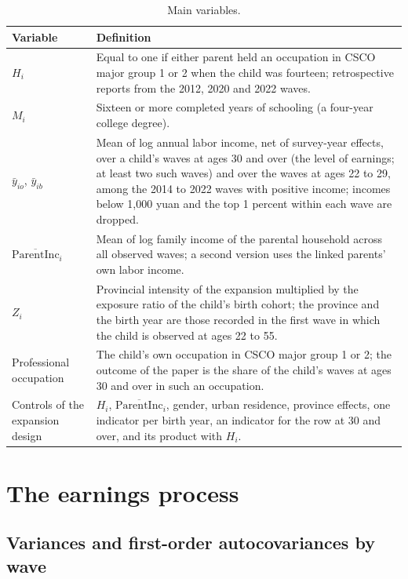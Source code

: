 \documentclass[11pt]{article}
\numberwithin{equation}{section}
\newcommand{\pinc}{\overline{\mathrm{ParentInc}}}
\begin{document}
\begin{table}[H]
\centering
\small
\caption{Main variables.}
\label{oatab:vars}
\begin{tabular}{@{}L{3.6cm}L{11.0cm}@{}}
\toprule
Variable & Definition \\
\midrule
$H_i$ & Equal to one if either parent held an occupation in CSCO major
group 1 or 2 when the child was fourteen; retrospective reports from the
2012, 2020 and 2022 waves. \\
$M_i$ & Sixteen or more completed years of schooling (a four-year
college degree). \\
$\bar y_{io}$, $\bar y_{ib}$ & Mean of log annual labor income, net of
survey-year effects, over a child's waves at ages 30 and over (the
level of earnings; at least two such waves) and over the waves at ages
22 to 29, among the 2014 to 2022 waves with positive income; incomes
below 1,000 yuan and the top 1 percent within each wave are dropped. \\
$\pinc_i$ & Mean of log family income of the parental household across
all observed waves; a second version uses the linked parents' own labor
income. \\
$Z_{i}$ & Provincial intensity of the expansion multiplied by the
exposure ratio of the child's birth cohort; the province and the birth year are those recorded in the first wave in which the child is observed at ages 22 to 55. \\
Professional occupation & The child's own occupation in CSCO major
group 1 or 2; the outcome of the paper is the share of the child's
waves at ages 30 and over in such an occupation. \\
Controls of the expansion design & $H_i$, $\pinc_i$, gender, urban
residence, province effects, one indicator per birth year, an indicator
for the row at 30 and over, and its product with $H_i$. \\
\bottomrule
\end{tabular}
\end{table}

\section{The earnings process}
\label{oa:process}

\subsection{Variances and first-order autocovariances by wave}
\label{oa:autocov}
\end{document}
